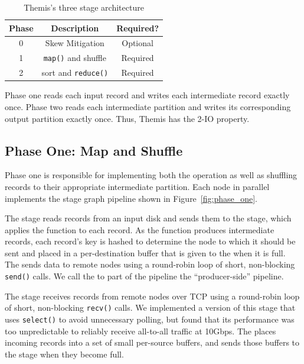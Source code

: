 \begin{table}
\centering
\caption{\label{tbl:stages} Themis's three stage architecture}
\begin{tabular}{|c|c|c|} \hline
\textbf{Phase} & \textbf{Description} & \textbf{Required?} \\\hline
0 & Skew Mitigation & Optional \\
1 & \texttt{map()} and shuffle & Required \\
2 & sort and \texttt{reduce()} & Required \\\hline
\end{tabular}
\end{table}

Phase one reads each input record and writes each intermediate record exactly
once.  Phase two reads each intermediate partition and writes its corresponding
output partition exactly once.  Thus, Themis has the 2-IO property.

\subsection{Phase One: Map and Shuffle}
\label{sec:phase_one}
\label{sec:map}

Phase one is responsible for implementing both the \map operation as well as
shuffling records to their appropriate intermediate partition.  Each node in
parallel implements the stage graph pipeline shown in
Figure~\ref{fig:phase_one}.

The \Readerbf stage reads records from an input disk and sends them to the
\Mapperbf stage, which applies the \map function to each record.  As the \map
function produces intermediate records, each record's key is hashed to
determine the node to which it should be sent and placed in a
per-destination buffer that is given to the \sender when it is full.  The
\Senderbf sends data to remote nodes using a round-robin loop of short,
non-blocking \texttt{send()} calls.  We call the \Reader to \Sender part of the
pipeline the ``producer-side'' pipeline.

The \Receiverbf stage receives records from remote nodes over TCP using
a round-robin loop of short, non-blocking \texttt{recv()} calls. We implemented
a version of this stage that uses \texttt{select()} to avoid unnecessary
polling, but found that its performance was too unpredictable to reliably
receive all-to-all traffic at 10Gbps. The \receiver places incoming records
into a set of small per-source buffers, and sends those buffers to
the \Demux stage when they become full.


